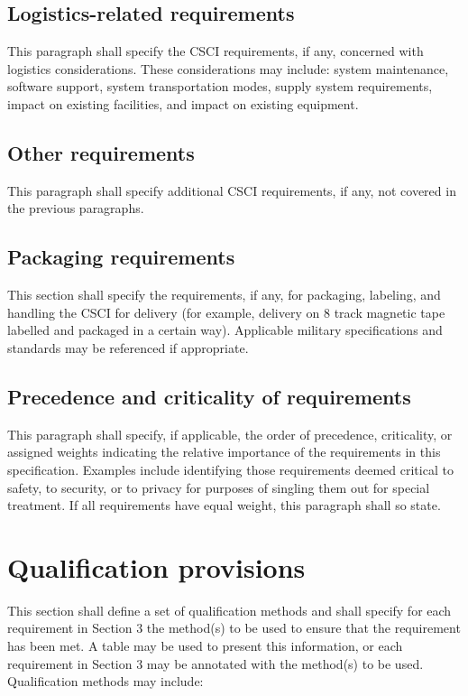 \documentclass{fidata-report-template}
\begin{document}
\subsection{Logistics-related requirements}

This paragraph shall specify the CSCI requirements, if any, concerned
with logistics considerations. These considerations may include: system
maintenance, software support, system transportation modes, supply
system requirements, impact on existing facilities, and impact on
existing equipment.

\subsection{Other requirements}

This paragraph shall specify additional CSCI requirements, if any, not
covered in the previous paragraphs.

\subsection{Packaging requirements}

This section shall specify the requirements, if any, for packaging,
labeling, and handling the CSCI for delivery (for example, delivery on 8
track magnetic tape labelled and packaged in a certain way). Applicable
military specifications and standards may be referenced if appropriate.

\subsection{Precedence and criticality of requirements}

This paragraph shall specify, if applicable, the order of precedence,
criticality, or assigned weights indicating the relative importance of
the requirements in this specification. Examples include identifying
those requirements deemed critical to safety, to security, or to privacy
for purposes of singling them out for special treatment. If all
requirements have equal weight, this paragraph shall so state.

\section{Qualification provisions}

This section shall define a set of qualification methods and shall
specify for each requirement in Section 3 the method(s) to be used to
ensure that the requirement has been met. A table may be used to present
this information, or each requirement in Section 3 may be annotated with
the method(s) to be used. Qualification methods may include:
\end{document}
